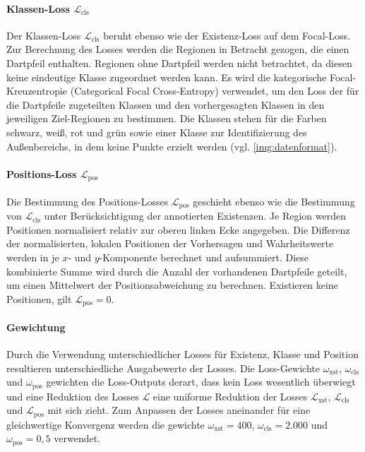 \vspace*{-0.1cm}
\paragraph{Klassen-Loss $\mathcal{L}_\text{cls}$}

Der Klassen-Loss $\mathcal{L}_\text{cls}$ beruht ebenso wie der Existenz-Loss auf dem Focal-Loss. Zur Berechnung des Losses werden die Regionen in Betracht gezogen, die einen Dartpfeil enthalten. Regionen ohne Dartpfeil werden nicht betrachtet, da diesen keine eindeutige Klasse zugeordnet werden kann. Es wird die kategorische Focal-Kreuzentropie (Categorical Focal Cross-Entropy) \cite{focal_loss} verwendet, um den Loss der für die Dartpfeile zugeteilten Klassen und den vorhergesagten Klassen in den jeweiligen Ziel-Regionen zu bestimmen. Die Klassen stehen für die Farben schwarz, weiß, rot und grün sowie einer Klasse zur Identifizierung des Außenbereichs, in dem keine Punkte erzielt werden (vgl. \autoref{img:datenformat}).

\paragraph{Positions-Loss $\mathcal{L}_\text{pos}$}

Die Bestimmung des Positions-Losses $\mathcal{L}_\text{pos}$ geschieht ebenso wie die Bestimmung von $\mathcal{L}_\text{cls}$ unter Berücksichtigung der annotierten Existenzen. Je Region werden Positionen normalisiert relativ zur oberen linken Ecke angegeben. Die Differenz der normalisierten, lokalen Positionen der Vorhersagen und Wahrheitswerte werden in je $x$- und $y$-Komponente berechnet und aufsummiert. Diese kombinierte Summe wird durch die Anzahl der vorhandenen Dartpfeile geteilt, um einen Mittelwert der Positionsabweichung zu berechnen. Existieren keine Positionen, gilt $\mathcal{L}_\text{pos} = 0$.

\paragraph{Gewichtung}

Durch die Verwendung unterschiedlicher Losses für Existenz, Klasse und Position resultieren unterschiedliche Ausgabewerte der Losses. Die Loss-Gewichte $\omega_\text{xst}$, $\omega_\text{cls}$ und $\omega_\text{pos}$ gewichten die Loss-Outputs derart, dass kein Loss wesentlich überwiegt und eine Reduktion des Losses $\mathcal{L}$ eine uniforme Reduktion der Losses $\mathcal{L}_\text{xst}$, $\mathcal{L}_\text{cls}$ und $\mathcal{L}_\text{pos}$ mit sich zieht. Zum Anpassen der Losses aneinander für eine gleichwertige Konvergenz werden die gewichte $\omega_\text{xst} = 400$, $\omega_\text{cls} = 2.000$ und $\omega_\text{pos} = 0,5$ verwendet.

